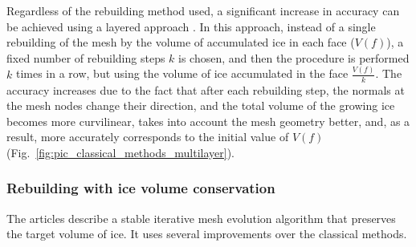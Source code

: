 Regardless of the rebuilding method used, a significant increase in accuracy can be achieved using a layered approach \cite{BourgaultCote}.
In this approach, instead of a single rebuilding of the mesh by the volume of accumulated ice in each face ($V(f)$), a fixed number of rebuilding steps $k$ is chosen, and then the procedure is performed $k$ times in a row, but using the volume of ice accumulated in the face $\frac{V(f)}{k}$.
The accuracy increases due to the fact that after each rebuilding step, the normals at the mesh nodes change their direction, and the total volume of the growing ice becomes more curvilinear, takes into account the mesh geometry better, and, as a result, more accurately corresponds to the initial value of $V(f)$ (Fig.~\ref{fig:pic_classical_methods_multilayer}).

\subsubsection{Rebuilding with ice volume conservation}

The articles \cite{Thompson,Tong} describe a stable iterative mesh evolution algorithm that preserves the target volume of ice.
It uses several improvements over the classical methods.

